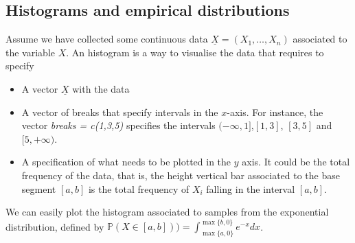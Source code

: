 		\subsection{ Histograms and empirical distributions}
		\label{ss:histogram}
		Assume we have collected some continuous data $\underline X = (X_1, \ldots, X_n)$ associated to the variable $X$. An histogram is a way to visualise the data that requires to specify 
		\begin{itemize}
			\item A vector $\underline X$ with the data  
			\item A vector of breaks that specify intervals in the $x$-axis. For instance, the vector \textit{ breaks = c(1,3,5)} specifies the intervals $(-\infty, 1]$,$[1,3]$, $[3,5]$ and $[5, +\infty)$. 
			\item A specification of what needs to be plotted in the $y$ axis. It could be the total frequency of the data, that is, the height vertical bar associated to the base segment $[a,b]$ is the total frequency of $X_i$ falling in the interval $[a,b]$.   
		\end{itemize}

	We can easily plot the histogram associated to samples from the exponential distribution, defined by $\mathbb P(X \in [a,b])) = \int_{\max\{a,0\}}^{\max\{b,0\}} e^{-x} dx$.

